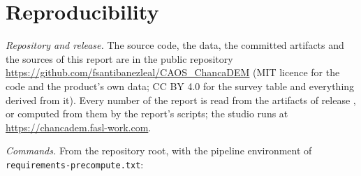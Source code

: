 \section{Reproducibility}\label{sec:repro}

\emph{Repository and release.} The source code, the data, the committed artifacts and the sources of this report are in the public repository
\url{https://github.com/fsantibanezleal/CAOS_ChancaDEM} (MIT licence for the code and the product's own data; CC BY 4.0 for the survey table and
everything derived from it). Every number of the report is read from the artifacts of release \docrelease, or computed from them by the report's scripts; the studio runs at
\url{https://chancadem.fasl-work.com}.

\emph{Commands.} From the repository root, with the pipeline environment of \texttt{requirements-precompute.txt}:
